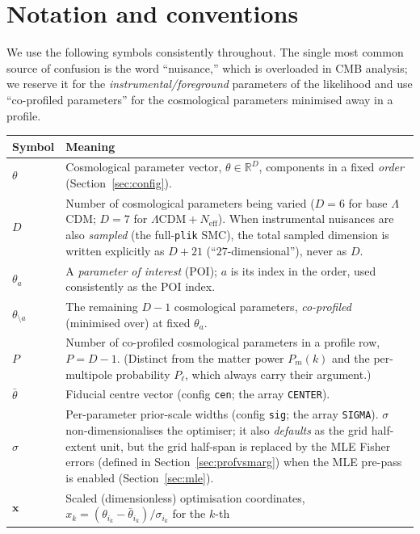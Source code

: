 \documentclass[11pt]{article}
\newcommand{\code}[1]{\texttt{\small #1}}
\newcommand{\Neff}{N_{\mathrm{eff}}}
\newcommand{\R}{\mathbb{R}}
\begin{document}
\section{Notation and conventions}
\label{sec:notation}

We use the following symbols consistently throughout. The single most
common source of confusion is the word ``nuisance,'' which is overloaded
in CMB analysis; we reserve it for the \emph{instrumental/foreground}
parameters of the likelihood and use ``co-profiled parameters'' for the
cosmological parameters minimised away in a profile.

\begin{longtable}{p{}p{}}
\toprule
Symbol & Meaning \\
\midrule
\endhead
$\theta$ & Cosmological parameter vector, $\theta\in\R^{D}$, components in
a fixed \emph{order} (Section~\ref{sec:config}). \\
$D$ & Number of cosmological parameters being varied
($D=6$ for base $\Lambda$CDM; $D=7$ for $\Lambda\mathrm{CDM}+\Neff$). When
instrumental nuisances are also \emph{sampled} (the full-\code{plik} SMC),
the total sampled dimension is written explicitly as $D+21$
(``$27$-dimensional''), never as $D$. \\
$\theta_a$ & A \emph{parameter of interest} (POI); $a$ is its index in
the order, used consistently as the POI index. \\
$\theta_{\setminus a}$ & The remaining $D-1$ cosmological parameters,
\emph{co-profiled} (minimised over) at fixed $\theta_a$. \\
$P$ & Number of co-profiled cosmological parameters in a profile row,
$P=D-1$. (Distinct from the matter power $P_m(k)$ and the per-multipole
probability $P_\ell$, which always carry their argument.) \\
$\bar\theta$ & Fiducial centre vector (config \code{cen}; the array
\code{CENTER}). \\
$\sigma$ & Per-parameter prior-scale widths (config \code{sig}; the array
\code{SIGMA}). $\sigma$ non-dimensionalises the optimiser; it also
\emph{defaults} as the grid half-extent unit, but the grid half-span is
replaced by the MLE Fisher errors (defined in Section~\ref{sec:profvsmarg})
when the MLE pre-pass is enabled (Section~\ref{sec:mle}). \\
$\bm{x}$ & Scaled (dimensionless) optimisation coordinates,
$x_k=(\theta_{i_k}-\bar\theta_{i_k})/\sigma_{i_k}$ for the $k$-th

\end{longtable}
\end{document}
